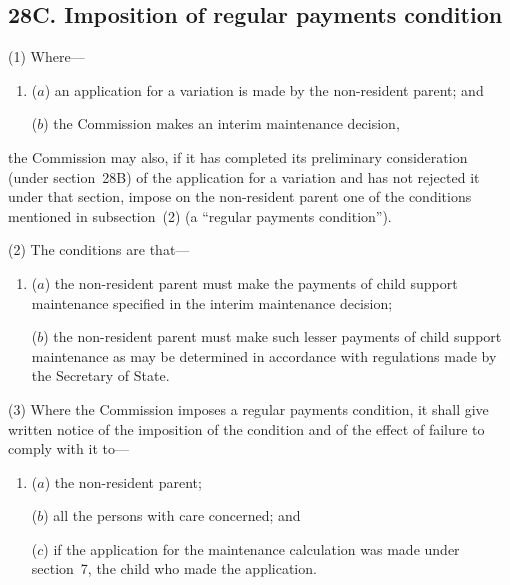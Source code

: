 \documentclass[12pt,a4paper]{article}
\begin{document}

\subsection{28C. Imposition of regular payments condition}

(1) Where—
\begin{enumerate}\item[]
($a$) an application for a variation is made by the non-resident parent; and

($b$) the 
Commission  %
makes an interim maintenance decision,
\end{enumerate}
the 
Commission  %
may also, if 
it  %
has completed 
its  %
preliminary consideration (under section~28B) of the application for a variation and has not rejected it under that section, impose on the non-resident parent one of the conditions mentioned in subsection~(2)  (a “regular payments condition”).

(2) The conditions are that—
\begin{enumerate}\item[]
($a$) the non-resident parent must make the payments of child support maintenance specified in the interim maintenance decision;

($b$) the non-resident parent must make such lesser payments of child support maintenance as may be determined in accordance with regulations made by the Secretary of State.
\end{enumerate}

(3) Where the 
Commission  %
imposes a regular payments condition, 
it  %
shall give written notice of the imposition of the condition and of the effect of failure to comply with it to—
\begin{enumerate}\item[]
($a$) the non-resident parent;

($b$) all the persons with care concerned; and

($c$) if the application for the maintenance calculation was made under section~7, the child who made the application.
\end{enumerate}
\end{document}
